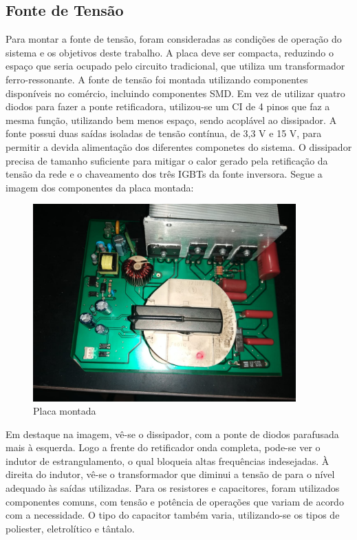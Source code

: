 \subsection{Fonte de Tensão}
Para montar a fonte de tensão, foram consideradas as condições de operação do sistema e os objetivos deste trabalho. A placa deve ser compacta, reduzindo o espaço que seria ocupado pelo circuito tradicional, que utiliza um transformador ferro-ressonante. A fonte de tensão foi montada utilizando componentes disponíveis no comércio, incluindo componentes SMD. Em vez de utilizar quatro diodos para fazer a ponte retificadora, utilizou-se um CI de 4 pinos que faz a mesma função, utilizando bem menos espaço, sendo acoplável ao dissipador.  A fonte possui duas saídas isoladas de tensão contínua, de 3,3 V e 15 V, para permitir a devida alimentação dos diferentes componetes do sistema. O dissipador precisa de tamanho suficiente para mitigar o calor gerado pela retificação da tensão da rede e o chaveamento dos três IGBTs da fonte inversora. Segue a imagem dos componentes da placa montada:

\begin{figure}[H]
    \centering
    \includegraphics[width=0.9\textwidth]{./dados/figuras/placa_hv}
    \caption{Placa montada}
    \label{fig:figura-montagem-font}
\end{figure}

Em destaque na imagem, vê-se o dissipador, com a ponte de diodos parafusada mais à esquerda.  Logo a frente do retificador onda completa, pode-se ver o indutor de estrangulamento, o qual bloqueia altas frequências indesejadas. À direita do indutor, vê-se o transformador que diminui a tensão de para o nível adequado às saídas utilizadas.  Para os resistores e capacitores, foram utilizados componentes comuns, com tensão e potência de operações que variam de acordo com a necessidade. O tipo do capacitor também varia, utilizando-se os tipos de poliester, eletrolítico e tântalo.


